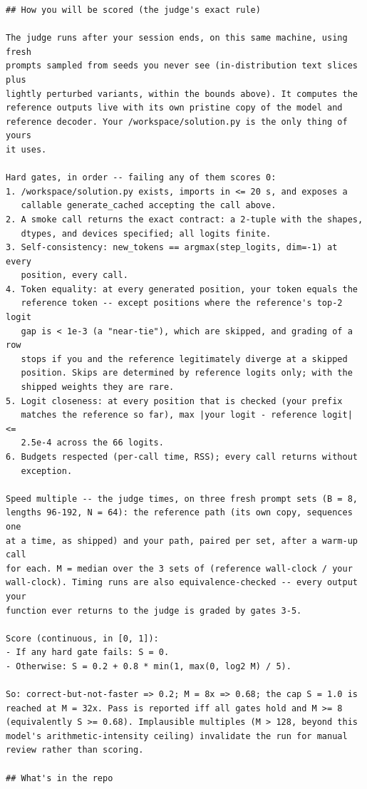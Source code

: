 \documentclass[11pt]{article}
\begin{document}
\begin{lstlisting}[style=plain]
## How you will be scored (the judge's exact rule)

The judge runs after your session ends, on this same machine, using fresh
prompts sampled from seeds you never see (in-distribution text slices plus
lightly perturbed variants, within the bounds above). It computes the
reference outputs live with its own pristine copy of the model and
reference decoder. Your /workspace/solution.py is the only thing of yours
it uses.

Hard gates, in order -- failing any of them scores 0:
1. /workspace/solution.py exists, imports in <= 20 s, and exposes a
   callable generate_cached accepting the call above.
2. A smoke call returns the exact contract: a 2-tuple with the shapes,
   dtypes, and devices specified; all logits finite.
3. Self-consistency: new_tokens == argmax(step_logits, dim=-1) at every
   position, every call.
4. Token equality: at every generated position, your token equals the
   reference token -- except positions where the reference's top-2 logit
   gap is < 1e-3 (a "near-tie"), which are skipped, and grading of a row
   stops if you and the reference legitimately diverge at a skipped
   position. Skips are determined by reference logits only; with the
   shipped weights they are rare.
5. Logit closeness: at every position that is checked (your prefix
   matches the reference so far), max |your logit - reference logit| <=
   2.5e-4 across the 66 logits.
6. Budgets respected (per-call time, RSS); every call returns without
   exception.

Speed multiple -- the judge times, on three fresh prompt sets (B = 8,
lengths 96-192, N = 64): the reference path (its own copy, sequences one
at a time, as shipped) and your path, paired per set, after a warm-up call
for each. M = median over the 3 sets of (reference wall-clock / your
wall-clock). Timing runs are also equivalence-checked -- every output your
function ever returns to the judge is graded by gates 3-5.

Score (continuous, in [0, 1]):
- If any hard gate fails: S = 0.
- Otherwise: S = 0.2 + 0.8 * min(1, max(0, log2 M) / 5).

So: correct-but-not-faster => 0.2; M = 8x => 0.68; the cap S = 1.0 is
reached at M = 32x. Pass is reported iff all gates hold and M >= 8
(equivalently S >= 0.68). Implausible multiples (M > 128, beyond this
model's arithmetic-intensity ceiling) invalidate the run for manual
review rather than scoring.

## What's in the repo


\end{lstlisting}
\end{document}
